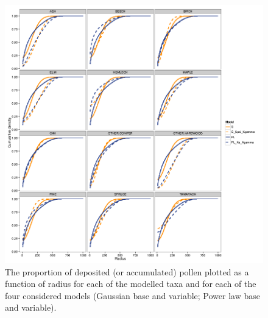 \begin{figure}
\centering
\includegraphics[width=7in]{figures/kernel_discrete_cdfs.png}
\caption{The proportion of deposited (or accumulated) pollen plotted
  as a function of radius for each of the modelled taxa and for each
  of the four considered models (Gaussian base and variable; Power law
  base and variable).}
\label{fig:cdf}
\end{figure}



